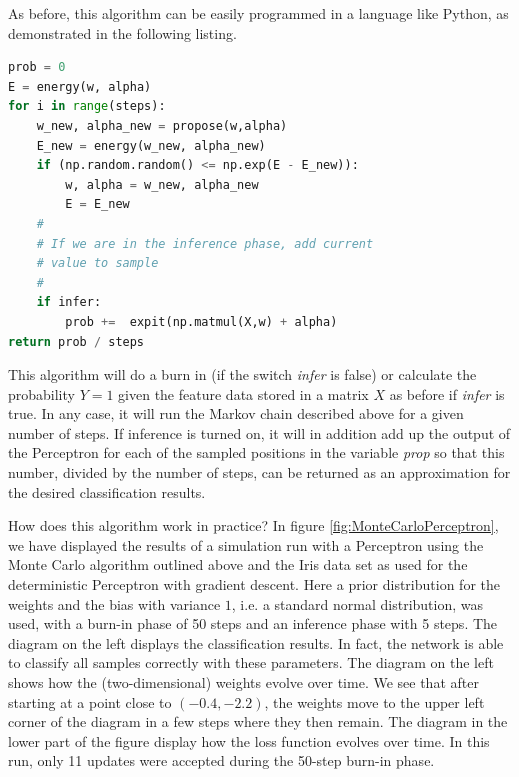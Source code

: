 \documentclass[a4paper, draft]{report}
\numberwithin{section}{chapter}
\numberwithin{equation}{chapter}
\theoremstyle{own}
\theoremstyle{remark}
\begin{document}
As before, this algorithm can be easily programmed in a language like Python, as demonstrated in the following listing.

\begin{lstlisting}[frame=single,language=Python,caption=Monte Carlo Perceptron in Python]
prob = 0
E = energy(w, alpha)
for i in range(steps):
    w_new, alpha_new = propose(w,alpha)
    E_new = energy(w_new, alpha_new)
    if (np.random.random() <= np.exp(E - E_new)):
        w, alpha = w_new, alpha_new
        E = E_new
    #
    # If we are in the inference phase, add current 
    # value to sample
    # 
    if infer:
        prob +=  expit(np.matmul(X,w) + alpha)
return prob / steps
\end{lstlisting}

This algorithm will do a burn in (if the switch {\it infer} is false) or calculate the probability $Y = 1$ given the feature data stored in a matrix $X$ as before if
{\it infer} is true. In any case, it will run the Markov chain described above for a given number of steps. If inference is turned on, it will in addition add up the output of the Perceptron for each of the sampled positions in the variable {\it prop} so
that this number, divided by the number of steps, can be returned as an approximation for the desired classification results. 

How does this algorithm work in practice? In figure \ref{fig:MonteCarloPerceptron}, we have displayed the results of a simulation run with a Perceptron using the Monte Carlo algorithm outlined above and the Iris data set as used for the deterministic Perceptron with gradient descent. Here a prior distribution for the weights and the bias with variance $1$, i.e. a standard normal distribution, was used, with a burn-in phase of 50 steps and an inference phase with 5 steps. The diagram on the left displays the classification results. In fact, the network is able to classify all samples correctly with these parameters. The diagram on the left shows how the (two-dimensional) weights evolve over time. We see that after starting at a point close to  $(-0.4, -2.2)$, the weights move to the upper left corner of the diagram in a few steps where they then remain. The diagram in the lower part of the figure display how the loss function evolves over time. In this run, only 11 updates were accepted during the 50-step burn-in phase.
\end{document}
